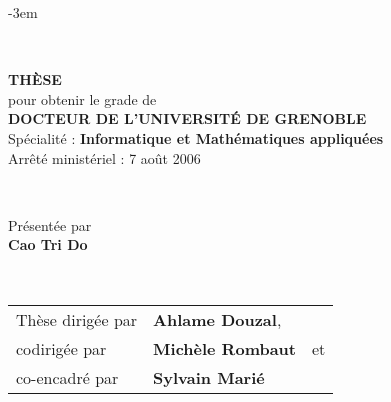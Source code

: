 \begingroup
\fontsize{13pt}{13pt}\selectfont

\AddToShipoutPicture*{\BackgroundPic}
\def\leftshift{0.82\textwidth}
\def\espvert{0.25cm}
\setlength{\parskip}{0pt}
\begin{titlepage}
\begin{adjustwidth}{}{-3em}
\begin{flushleft}

~~

\vfill

\begin{flushright}
\begin{minipage}{\leftshift}
\begin{flushleft}
\textsc{\Large \bf THÈSE}\\[\espvert]
{pour obtenir le grade de}\\[\espvert]
\textsc{\Large \bf DOCTEUR DE L'UNIVERSITÉ DE GRENOBLE}\\[\espvert]
{Spécialité : \textbf{Informatique et Mathématiques appliquées}}\\[\espvert]
{Arrêté ministériel : 7 août 2006}
\end{flushleft}
\end{minipage}
\end{flushright}~~\\[0.75cm]

\vfill

\begin{flushright}
\begin{minipage}{\leftshift}
\begin{flushleft}
{Présentée par}\\
{\Large \textbf{Cao Tri Do}}
\end{flushleft}
\end{minipage}
\end{flushright}~~\\[0.75cm]

\vfill

\begin{flushright}
\begin{minipage}{\leftshift}
\begin{flushleft}
{
\begin{tabular}{lll}
	Thèse dirigée par 	& \textbf{Ahlame Douzal},	& \\
	codirigée par 		& \textbf{Michèle Rombaut} 			& et \\
	co-encadré par 		& \textbf{Sylvain Mari\'{e}} 		&
\end{tabular}	
}
\end{flushleft}
\end{minipage}
\end{flushright}


\end{flushleft}
\end{adjustwidth}
\end{titlepage}
